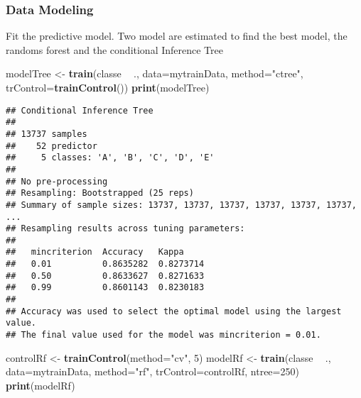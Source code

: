 \documentclass[]{article}
\newenvironment{Shaded}{\begin{snugshade}}{\end{snugshade}}
\newcommand{\KeywordTok}[1]{\textcolor[rgb]{0.13,0.29,0.53}{\textbf{#1}}}
\newcommand{\DataTypeTok}[1]{\textcolor[rgb]{0.13,0.29,0.53}{#1}}
\newcommand{\DecValTok}[1]{\textcolor[rgb]{0.00,0.00,0.81}{#1}}
\newcommand{\FloatTok}[1]{\textcolor[rgb]{0.00,0.00,0.81}{#1}}
\newcommand{\StringTok}[1]{\textcolor[rgb]{0.31,0.60,0.02}{#1}}
\newcommand{\OtherTok}[1]{\textcolor[rgb]{0.56,0.35,0.01}{#1}}
\newcommand{\OperatorTok}[1]{\textcolor[rgb]{0.81,0.36,0.00}{\textbf{#1}}}
\newcommand{\NormalTok}[1]{#1}
\begin{document}
\begin{Shaded}
\end{Shaded}

\subsubsection{Data Modeling}\label{data-modeling}

Fit the predictive model. Two model are estimated to find the best
model, the randoms forest and the conditional Inference Tree

\begin{Shaded}
\begin{Highlighting}[]
\NormalTok{modelTree <-}\StringTok{ }\KeywordTok{train}\NormalTok{(classe }\OperatorTok{~}\StringTok{ }\NormalTok{., }\DataTypeTok{data=}\NormalTok{mytrainData, }\DataTypeTok{method=}\StringTok{"ctree"}\NormalTok{, }\DataTypeTok{trControl=}\KeywordTok{trainControl}\NormalTok{())}
\KeywordTok{print}\NormalTok{(modelTree)}
\end{Highlighting}
\end{Shaded}

\begin{verbatim}
## Conditional Inference Tree 
## 
## 13737 samples
##    52 predictor
##     5 classes: 'A', 'B', 'C', 'D', 'E' 
## 
## No pre-processing
## Resampling: Bootstrapped (25 reps) 
## Summary of sample sizes: 13737, 13737, 13737, 13737, 13737, 13737, ... 
## Resampling results across tuning parameters:
## 
##   mincriterion  Accuracy   Kappa    
##   0.01          0.8635282  0.8273714
##   0.50          0.8633627  0.8271633
##   0.99          0.8601143  0.8230183
## 
## Accuracy was used to select the optimal model using the largest value.
## The final value used for the model was mincriterion = 0.01.
\end{verbatim}

\begin{Shaded}
\begin{Highlighting}[]
\NormalTok{controlRf <-}\StringTok{ }\KeywordTok{trainControl}\NormalTok{(}\DataTypeTok{method=}\StringTok{"cv"}\NormalTok{, }\DecValTok{5}\NormalTok{)}
\NormalTok{modelRf <-}\StringTok{ }\KeywordTok{train}\NormalTok{(classe }\OperatorTok{~}\StringTok{ }\NormalTok{., }\DataTypeTok{data=}\NormalTok{mytrainData, }\DataTypeTok{method=}\StringTok{"rf"}\NormalTok{, }\DataTypeTok{trControl=}\NormalTok{controlRf, }\DataTypeTok{ntree=}\DecValTok{250}\NormalTok{)}
\KeywordTok{print}\NormalTok{(modelRf)}
\end{Highlighting}
\end{Shaded}
\end{document}
